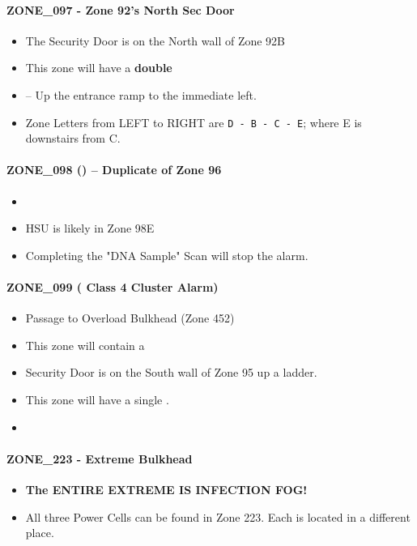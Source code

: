 \paragraph{ZONE\_097 - Zone 92's North Sec Door}
\begin{itemize}
    \item The Security Door is on the North wall of Zone 92B
    \item This zone will have a \textbf{double} \gtfoenemyscout{}
    \item {} -- Up the entrance ramp to the immediate left.
    \item Zone Letters from LEFT to RIGHT are \texttt{D - B - C - E}; where E is downstairs from C.
\end{itemize}

\paragraph{ZONE\_098 (\erroralarm{}) -- Duplicate of Zone 96}
\begin{itemize}
    \item {}
    \item HSU is likely in Zone 98E
    \item Completing the "DNA Sample" Scan will stop the alarm.
\end{itemize}

\paragraph{ZONE\_099 ( Class 4 Cluster Alarm)}
\begin{itemize}
    \item {\color{Blue}Passage to Overload Bulkhead (Zone 452)}
    \item This zone will contain a \gtfobhkey{}
    \item Security Door is on the South wall of Zone 95 up a ladder.
    \item This zone will have a single \gtfoenemyscout{}.
    \item {}
\end{itemize}

\paragraph{ZONE\_223 - Extreme Bulkhead}
\begin{itemize}
    \item {} \textbf{The ENTIRE EXTREME IS INFECTION FOG!}
    \item All three Power Cells can be found in Zone 223.  Each is located in a different place.
\end{itemize}

